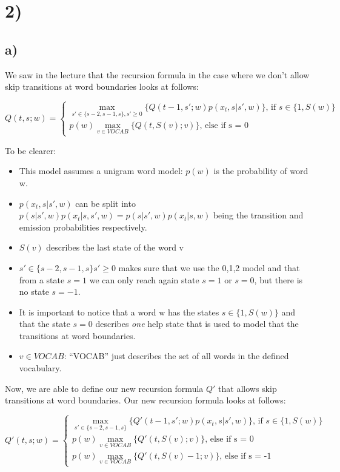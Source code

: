 \section*{2)} %
\label{sec:2}

\subsection*{a)} %
\label{sub:a}



We saw in the lecture that the recursion formula in the case where we don't allow skip transitions at word boundaries looks at follows: 

\[
Q(t,s;w) = 
\begin{cases}
	\max_{s' \in \{ s-2, s-1, s\}, s' \geq 0}\{Q(t-1,s';w) p(x_t,s|s',w)\} \text{, if } s \in \{1,S(w)\} \\
	p(w)\max_{v \in VOCAB}\{Q(t, S(v);v)\} \text{, else if s = 0}
\end{cases}
\]

To be clearer: 
\begin{itemize}
	\item This model assumes a unigram word model: $p(w)$ is the probability of word w.
	\item $p(x_t,s|s',w)$ can be split into $p(s|s',w) p(x_t|s,s',w) = p(s|s',w) p(x_t|s,w) $ being the transition and emission probabilities 
	respectively.
	\item $S(v)$ describes the last state of the word v
	\item ${s' \in \{ s-2, s-1, s\} s' \geq 0}$ makes sure that we use the {0,1,2} model and that from a state $s=1$ we can only reach again state $s=1$ or $s=0$, but 
	there is no state $s=-1$.
	\item It is important to notice that a word w has the states $s \in \{1,S(w)\}$ and that the state $s = 0$ describes \emph{one} help state that is used to model
	that the transitions at word boundaries. 
	\item ${v \in VOCAB}$: ``VOCAB'' just describes the set of all words in the defined vocabulary.
\end{itemize}

Now, we are able to define our new recursion formula $Q'$ that allows skip transitions at word boundaries. Our new recursion formula looks at follows:

\[
Q'(t,s;w) = 
\begin{cases}
	\max_{s' \in \{ s-2, s-1, s\}}\{Q'(t-1,s';w) p(x_t,s|s',w)\} \text{, if } s \in \{1,S(w)\} \\
	p(w)\max_{v \in VOCAB}\{Q'(t, S(v);v) \} \text{, else if s = 0} \\
	p(w)\max_{v \in VOCAB}\{Q'(t, S(v) - 1;v) \} \text{, else if s = -1} 
\end{cases}
\]

